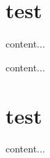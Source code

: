 \documentclass[10pt]{beamer}
\begin{document}
\section{test}
\begin{frame}
content...
\end{frame}

\begin{frame}
content...
\end{frame}

\section{test}
\begin{frame}
content...
\end{frame}
\end{document}
